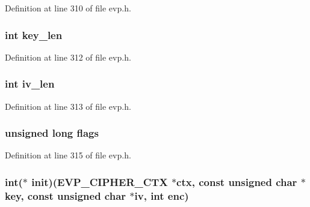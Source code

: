 Definition at line 310 of file evp.\+h.

\subsubsection[{\texorpdfstring{key\+\_\+len}{key_len}}]{\setlength{\rightskip}{0pt plus 5cm}int key\+\_\+len}\hypertarget{structevp__cipher__st_a7d361be539db0a416204f2af38248d08}{}\label{structevp__cipher__st_a7d361be539db0a416204f2af38248d08}


Definition at line 312 of file evp.\+h.

\subsubsection[{\texorpdfstring{iv\+\_\+len}{iv_len}}]{\setlength{\rightskip}{0pt plus 5cm}int iv\+\_\+len}\hypertarget{structevp__cipher__st_a9a20dd55d0e03d26c39118b61042d5c5}{}\label{structevp__cipher__st_a9a20dd55d0e03d26c39118b61042d5c5}


Definition at line 313 of file evp.\+h.

\subsubsection[{\texorpdfstring{flags}{flags}}]{\setlength{\rightskip}{0pt plus 5cm}unsigned long flags}\hypertarget{structevp__cipher__st_a9e339c2784bd040b26a5112866700bff}{}\label{structevp__cipher__st_a9e339c2784bd040b26a5112866700bff}


Definition at line 315 of file evp.\+h.

\subsubsection[{\texorpdfstring{init}{init}}]{\setlength{\rightskip}{0pt plus 5cm}int($\ast$ init)({\bf E\+V\+P\+\_\+\+C\+I\+P\+H\+E\+R\+\_\+\+C\+TX} $\ast$ctx, const unsigned char $\ast$key, const unsigned char $\ast$iv, int enc)}\hypertarget{structevp__cipher__st_a20083d7d9fea622956f909275f06e955}{}\label{structevp__cipher__st_a20083d7d9fea622956f909275f06e955}


